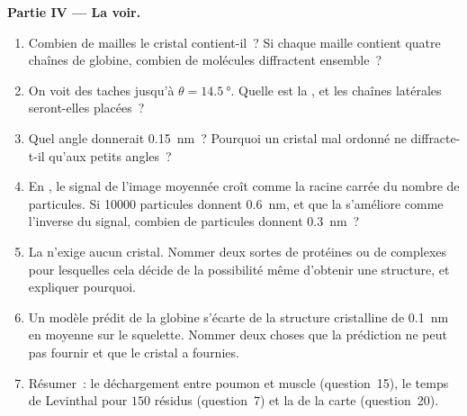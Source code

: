 \begin{problem}
\medskip
\noindent\textbf{Partie IV --- La voir.}
\begin{enumerate}[resume]
  \item Combien de mailles le cristal contient-il~? Si chaque maille
        contient quatre chaînes de globine, combien de molécules
        diffractent ensemble~?
  \item On voit des taches jusqu'à $\theta = \qty{14.5}{\degree}$.
        Quelle est la , et les chaînes latérales
        seront-elles placées~?
  \item Quel angle donnerait \qty{0.15}{nm}~? Pourquoi un cristal mal
        ordonné ne diffracte-t-il qu'aux petits angles~?
  \item En , le signal de l'image moyennée
        croît comme la racine carrée du nombre de particules. Si
        \num{10000} particules donnent \qty{0.6}{nm}, et que la
         s'améliore comme l'inverse du signal, combien de
        particules donnent \qty{0.3}{nm}~?
  \item La  n'exige aucun cristal. Nommer
        deux sortes de protéines ou de complexes pour lesquelles cela
        décide de la possibilité même d'obtenir une structure, et
        expliquer pourquoi.
  \item Un modèle prédit de la globine s'écarte de la structure
        cristalline de \qty{0.1}{nm} en moyenne sur le squelette.
        Nommer deux choses que la prédiction ne peut pas fournir et que
        le cristal a fournies.
  \item Résumer~: le déchargement entre poumon et muscle
        (question~15), le temps de Levinthal pour $150$ résidus
        (question~7) et la  de la carte (question~20).
\end{enumerate}
\end{problem}
